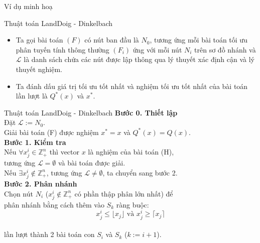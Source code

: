 \documentclass{beamer}
\begin{document}
\begin{frame}{Ví dụ minh hoạ}

\end{frame}

\begin{frame}{Thuật toán LandDoig - Dinkelbach}
\begin{itemize}
\item Ta gọi bài toán $(F)$ có nút ban đầu là $N_0$, tương ứng mỗi bài toán tối ưu phân tuyến tính thông thường $(F_i)$ ứng với mỗi nút $N_i$ trên sơ đồ nhánh và $\mathcal{L}$ là danh sách chứa các nút được lập thông qua lý thuyết xác định cận và lý thuyết nghiệm.
\item Ta đánh dấu giá trị tối ưu tốt nhất và nghiệm tối ưu tốt nhất của bài toán lần lượt là $Q^*(x)$ và $x^*$.
\end{itemize}
\end{frame}

\begin{frame}{Thuật toán LandDoig - Dinkelbach}
\setlength{\parindent}{4em}
\noindent \textbf{Bước 0. Thiết lập} \\
Đặt $\mathcal{L}:={N_0}$. \\
Giải bài toán (F) được nghiệm $x^*=x$ và $Q^*(x)=Q(x)$. \\
\noindent \textbf{Bước 1. Kiểm tra} \\
Nếu $\forall x^i_j\in\mathbb{Z}^n_+$ thì vector $x$ là nghiệm của bài toán (H), \\ tương ứng $\mathcal{L}=\emptyset$ và bài toán được giải. \\
Nếu $\exists x^i_j\notin \mathbb{Z}^n_+$, tương ứng $\mathcal{L}\neq \emptyset$, ta chuyển sang bước 2. \\
\noindent \textbf{Bước 2. Phân nhánh} \\
Chọn nút $N_i$ ($x^i_j \notin \mathbb{Z}^n_+$ có phần thập phân lớn nhất) để \\ phân nhánh bằng cách thêm vào $S_k$ ràng buộc:
\begin{equation*}
x^i_j \leq \lfloor x_j \rfloor \text{ và } x^i_j \geq \lceil x_j \rceil 
\end{equation*} \\
lần lượt thành 2 bài toán con $S_i$ và $S_k$ ($k:=i+1$). \\
\end{frame}
\end{document}
